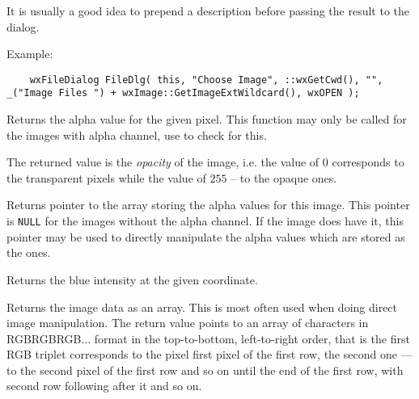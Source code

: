 It is usually a good idea to prepend a description before passing the result to the dialog.

Example:

\begin{verbatim}
    wxFileDialog FileDlg( this, "Choose Image", ::wxGetCwd(), "", _("Image Files ") + wxImage::GetImageExtWildcard(), wxOPEN );
\end{verbatim}




\label{wximagegetalpha}


Returns the alpha value for the given pixel. This function may only be called
for the images with alpha channel, use  to
check for this.

The returned value is the {\it opacity} of the image, i.e. the value of $0$
corresponds to the transparent pixels while the value of $255$ -- to the opaque
ones.


Returns pointer to the array storing the alpha values for this image. This
pointer is {\tt NULL} for the images without the alpha channel. If the image
does have it, this pointer may be used to directly manipulate the alpha values
which are stored as the  ones.


\label{wximagegetblue}


Returns the blue intensity at the given coordinate.


\label{wximagegetdata}


Returns the image data as an array. This is most often used when doing
direct image manipulation. The return value points to an array of
characters in RGBRGBRGB$\ldots$ format in the top-to-bottom, left-to-right
order, that is the first RGB triplet corresponds to the pixel first pixel of
the first row, the second one --- to the second pixel of the first row and so
on until the end of the first row, with second row following after it and so
on.

